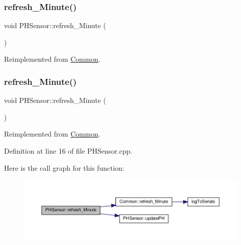 \subsubsection{\texorpdfstring{refresh\+\_\+\+Minute()}{refresh\_Minute()}\hspace{0.1cm}{\footnotesize\ttfamily [1/2]}}
{\footnotesize\ttfamily void P\+H\+Sensor\+::refresh\+\_\+\+Minute (\begin{DoxyParamCaption}{ }\end{DoxyParamCaption})\hspace{0.3cm}{\ttfamily [virtual]}}



Reimplemented from \hyperlink{class_common_a14e4462a94bd118028ce1d487ca0292c}{Common}.

\mbox{\label{class_p_h_sensor_a0cb40466ff35d33b729960b339f608ce}} 
\subsubsection{\texorpdfstring{refresh\+\_\+\+Minute()}{refresh\_Minute()}\hspace{0.1cm}{\footnotesize\ttfamily [2/2]}}
{\footnotesize\ttfamily void P\+H\+Sensor\+::refresh\+\_\+\+Minute (\begin{DoxyParamCaption}{ }\end{DoxyParamCaption})\hspace{0.3cm}{\ttfamily [virtual]}}



Reimplemented from \hyperlink{class_common_a14e4462a94bd118028ce1d487ca0292c}{Common}.



Definition at line 16 of file P\+H\+Sensor.\+cpp.

Here is the call graph for this function\+:
\nopagebreak
\begin{figure}[H]
\begin{center}
\leavevmode
\includegraphics[width=350pt]{class_p_h_sensor_a0cb40466ff35d33b729960b339f608ce_cgraph}
\end{center}
\end{figure}
\mbox{\label{class_p_h_sensor_af9730aece2d3bcb71ac9d4f1e6f96f1e}} 
